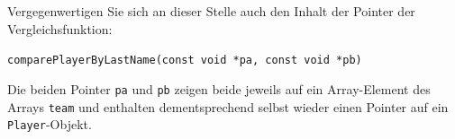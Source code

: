 Vergegenwertigen Sie sich an dieser Stelle auch den Inhalt der Pointer der
Vergleichsfunktion:

\noindent\texttt{comparePlayerByLastName(const void *pa, const void *pb)}

Die beiden Pointer \texttt{pa} und \texttt{pb} zeigen beide
jeweils auf ein Array-Element des Arrays \texttt{team} und enthalten
dementsprechend selbst wieder einen Pointer auf ein
\texttt{Player}-Objekt.
